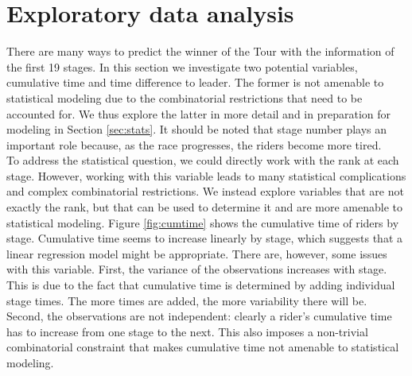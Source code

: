 \documentclass[aos,preprint]{imsart}
\begin{document}
\section{Exploratory data analysis} \label{sec:eda}


There are many ways to predict the winner of the Tour with the information of the first 19 stages. In this section we investigate two potential variables, cumulative time and time difference to leader. The former is not amenable to statistical modeling due to the combinatorial restrictions that need to be accounted for. We thus explore the latter in more detail and in preparation for modeling in Section \ref{sec:stats}. It should be noted that stage number plays an important role because, as the race progresses, the riders become more tired. \\




To address the statistical question, we could directly work with the rank at each stage. However, working with this variable leads to many statistical complications and complex combinatorial restrictions. We instead explore variables that are not exactly the rank, but that can be used to determine it and are more amenable to statistical modeling. Figure \ref{fig:cumtime} shows the cumulative time of riders by stage. Cumulative time seems to increase linearly by stage, which suggests that a linear regression model might be appropriate. There are, however, some issues with this variable. First, the variance of the observations increases with stage. This is due to the fact that cumulative time is determined by adding individual stage times. The more times are added, the more variability there will be. Second, the observations are not independent: clearly a rider's cumulative time has to increase from one stage to the next. This also imposes a non-trivial combinatorial constraint that makes cumulative time not amenable to statistical modeling. \\
\end{document}
